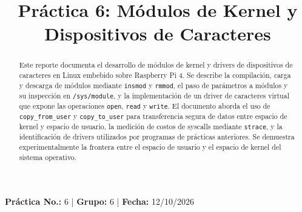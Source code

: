 \documentclass[conference]{IEEEtran}
\begin{document}
\title{Práctica 6: Módulos de Kernel y Dispositivos de Caracteres}

\author{
	\and
	\and
	\and
	\and
	\and
}

\maketitle

\begin{center}
	\vspace{-0.3cm}
	{\small
		\textbf{Práctica No.:} 6 \quad | \quad
		\textbf{Grupo:} 6 \quad | \quad
		\textbf{Fecha:} 12/10/2026
	}
	\vspace{0.2cm}
\end{center}

\begin{abstract}
	Este reporte documenta el desarrollo de módulos de kernel y drivers de dispositivos de caracteres en Linux embebido sobre Raspberry Pi 4. Se describe la compilación, carga y descarga de módulos mediante \texttt{insmod} y \texttt{rmmod}, el paso de parámetros a módulos y su inspección en \texttt{/sys/module}, y la implementación de un driver de caracteres virtual que expone las operaciones \texttt{open}, \texttt{read} y \texttt{write}. El documento aborda el uso de \texttt{copy\_from\_user} y \texttt{copy\_to\_user} para transferencia segura de datos entre espacio de kernel y espacio de usuario, la medición de costos de syscalls mediante \texttt{strace}, y la identificación de drivers utilizados por programas de prácticas anteriores. Se demuestra experimentalmente la frontera entre el espacio de usuario y el espacio de kernel del sistema operativo.
\end{abstract}
\end{document}
